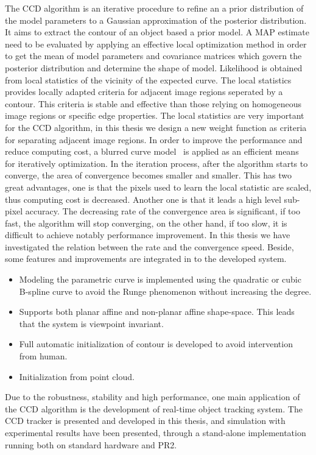 The CCD algorithm is an iterative procedure to refine an
a prior distribution of the model parameters to a Gaussian
approximation of the posterior distribution. It aims to extract the
contour of an object based a prior model. A MAP estimate need to be
evaluated by applying an effective local optimization method in order to get
the mean of model parameters and covariance matrices which govern the
posterior distribution and determine the shape of model. Likelihood is 
obtained from local statistics of the vicinity of the expected
curve. The local statistics provides locally adapted criteria for
adjacent image regions seperated by a contour. This criteria is stable
and effective than those relying on homogeneous image regions or
specific edge properties. The local statistics are very
important for the CCD algorithm, in this thesis we design a new weight
function as criteria for separating adjacent image regions. 
 In order to improve the performance and
reduce computing cost, a blurred curve model~\cite{hanek2004contracting} is applied as an efficient means for
iteratively optimization. In the iteration process, after the
algorithm starts to converge, the area of
convergence becomes smaller and smaller. This has two great
advantages, one is that the pixels used to learn the local statistic
are scaled, thus computing cost is decreased. Another one is that it
leads a high level sub-pixel accuracy. The decreasing rate of the
convergence area is significant, if too fast, the algorithm will stop
converging, on the other hand, if too slow, it is difficult to achieve
notably performance improvement. In this thesis we have investigated the relation between
the rate and the convergence speed.
Beside, some features and improvements are integrated in to the
developed system.
\begin{itemize}
\item Modeling the parametric curve is implemented using the quadratic or
cubic B-spline curve  to avoid the Runge phenomenon without increasing
the degree.
\item Supports both planar affine and non-planar affine
  shape-space. This leads that the system is viewpoint invariant.
\item Full automatic initialization of contour is developed to avoid
  intervention from human.
\item Initialization from point cloud.
\end{itemize}

Due to the robustness, stability and high performance, one main
application of the CCD algorithm is the development of real-time
object tracking system. The CCD tracker is presented and developed in
this thesis, and simulation with experimental results have been presented, through a
stand-alone implementation running both on
standard hardware and PR2.

